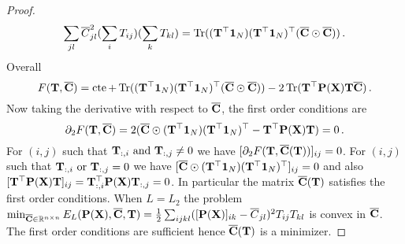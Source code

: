 \begin{proof}
\begin{equation}
		\begin{split}
			\sum_{jl} \overline{C}^2_{jl} (\sum_{i}T_{ij}) (\sum_{k}T_{kl}) & = \operatorname{Tr}(({\mathbf{T}}^\top \bm{1}_N) ({\mathbf{T}}^\top \bm{1}_N)^\top (\overline{{\mathbf{C}}} \odot \overline{{\mathbf{C}}}))\,. \\
		\end{split}
	\end{equation}
	Overall 
	\begin{equation}
		F({\mathbf{T}}, \overline{{\mathbf{C}}}) = \operatorname{cte} + \operatorname{Tr}(({\mathbf{T}}^\top \bm{1}_N) ({\mathbf{T}}^\top \bm{1}_N)^\top(\overline{{\mathbf{C}}} \odot \overline{{\mathbf{C}}}))-2\operatorname{Tr}({\mathbf{T}}^\top {\mathbf{P}}({\mathbf{X}}) {\mathbf{T}} \overline {{\mathbf{C}}})\,.
	\end{equation}
	Now taking the derivative with respect to $\overline {{\mathbf{C}}}$, the first order conditions are
	\begin{equation}
		\label{eq:foc}
		\partial_2 F({\mathbf{T}}, \overline{{\mathbf{C}}}) = 2(\overline {{\mathbf{C}}} \odot ({\mathbf{T}}^\top \bm{1}_N) ({\mathbf{T}}^\top \bm{1}_N)^\top - {\mathbf{T}}^\top {\mathbf{P}}({\mathbf{X}}) {\mathbf{T}}) = 0\,.
	\end{equation}
	For $(i,j)$ such that ${\mathbf{T}}_{:,i} \text{ and } {\mathbf{T}}_{:,j} \neq 0$ we have $[\partial_2 F({\mathbf{T}}, \overline{{\mathbf{C}}}({\mathbf{T}}))]_{ij} = 0$. For $(i,j)$ such that ${\mathbf{T}}_{:,i} \text{ or } {\mathbf{T}}_{:,j} = 0$ we have $[\overline {{\mathbf{C}}} \odot ({\mathbf{T}}^\top \bm{1}_N) ({\mathbf{T}}^\top \bm{1}_N)^\top]_{ij} = 0$ and also $[{\mathbf{T}}^\top {\mathbf{P}}({\mathbf{X}}) {\mathbf{T}}]_{ij} = {\mathbf{T}}_{:,i}^\top {\mathbf{P}}({\mathbf{X}}) {\mathbf{T}}_{:,j} = 0$. In particular the matrix $\overline{{\mathbf{C}}}({\mathbf{T}})$ satisfies the first order conditions. When $L = L_2$ the problem $\min_{\overline{{\mathbf{C}}} \in \mathbb{R}^{n \times n}}  E_L({\mathbf{P}}({\mathbf{X}}), \overline{{\mathbf{C}}}, {\mathbf{T}}) = \frac{1}{2}\sum_{ijkl}([{\mathbf{P}}({\mathbf{X}})]_{ik}-\overline{C}_{jl})^2 T_{ij} T_{kl}$ is convex in $\overline{{\mathbf{C}}}$. The first order conditions are sufficient hence $\overline{{\mathbf{C}}}({\mathbf{T}})$ is a minimizer.
	

\end{proof}
